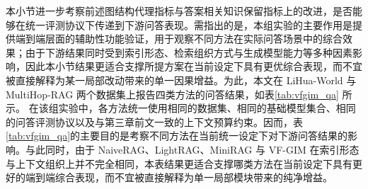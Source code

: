 \documentclass[promaster, vlined]{DissertUESTC}
\begin{document}
本小节进一步考察前述图结构代理指标与答案相关知识保留指标上的改进，是否能够在统一评测协议下传递到下游问答表现。需指出的是，本组实验的主要作用是提供端到端层面的辅助性功能验证，用于观察不同方法在实际问答场景中的综合效果；由于下游结果同时受到索引形态、检索组织方式与生成模型能力等多种因素影响，因此本小节结果更适合支撑所提方案在当前设定下具有更优综合表现，而不宜被直接解释为某一局部改动带来的单一因果增益。为此，本文在 LiHua-World 与 MultiHop-RAG 两个数据集上报告四类方法的问答结果，如表\ref{tab:vfgim_qa} 所示。
在该组实验中，各方法统一使用相同的数据集、相同的基础模型集合、相同的问答评测协议以及与第三章前文一致的上下文预算约束。因而，表\ref{tab:vfgim_qa}的主要目的是考察不同方法在当前统一设定下对下游问答结果的影响。与此同时，由于 NaiveRAG、LightRAG、MiniRAG 与 VF-GIM 在索引形态与上下文组织上并不完全相同，本表结果更适合支撑哪类方法在当前设定下具有更好的端到端综合表现，而不宜被直接解释为单一局部模块带来的纯净增益。
\end{document}
